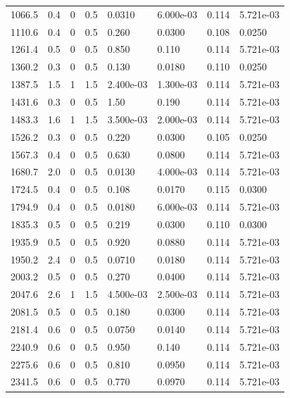 \documentclass[preview]{standalone}
\begin{document}
{{\begin{tabular}{L{1.2cm}C{1.2cm} C{0.3cm}C{0.5cm} C{1.4cm}C{1.4cm} C{1.4cm}C{1.4cm}}
  1066.5  &   0.4  & 0     & 0.5 &  0.0310  & 6.000e-03  & 0.114 &  5.721e-03   \\ 
  1110.6  &   0.4  & 0     & 0.5 &  0.260  & 0.0300  & 0.108 &  0.0250   \\ 
  1261.4  &   0.5  & 0     & 0.5 &  0.850  & 0.110  & 0.114 &  5.721e-03   \\ 
  1360.2  &   0.3  & 0     & 0.5 &  0.130  & 0.0180  & 0.110 &  0.0250   \\ 
  1387.5  &   1.5  & 1     & 1.5 &  2.400e-03  & 1.300e-03  & 0.114 &  5.721e-03   \\ 
  1431.6  &   0.3  & 0     & 0.5 &  1.50  & 0.190  & 0.114 &  5.721e-03   \\ 
  1483.3  &   1.6  & 1     & 1.5 &  3.500e-03  & 2.000e-03  & 0.114 &  5.721e-03   \\ 
  1526.2  &   0.3  & 0     & 0.5 &  0.220  & 0.0300  & 0.105 &  0.0250   \\ 
  1567.3  &   0.4  & 0     & 0.5 &  0.630  & 0.0800  & 0.114 &  5.721e-03   \\ 
  1680.7  &   2.0  & 0     & 0.5 &  0.0130  & 4.000e-03  & 0.114 &  5.721e-03   \\ 
  1724.5  &   0.4  & 0     & 0.5 &  0.108  & 0.0170  & 0.115 &  0.0300   \\ 
  1794.9  &   0.4  & 0     & 0.5 &  0.0180  & 6.000e-03  & 0.114 &  5.721e-03   \\ 
  1835.3  &   0.5  & 0     & 0.5 &  0.219  & 0.0300  & 0.110 &  0.0300   \\ 
  1935.9  &   0.5  & 0     & 0.5 &  0.920  & 0.0880  & 0.114 &  5.721e-03   \\ 
  1950.2  &   2.4  & 0     & 0.5 &  0.0710  & 0.0180  & 0.114 &  5.721e-03   \\ 
  2003.2  &   0.5  & 0     & 0.5 &  0.270  & 0.0400  & 0.114 &  5.721e-03   \\ 
  2047.6  &   2.6  & 1     & 1.5 &  4.500e-03  & 2.500e-03  & 0.114 &  5.721e-03   \\ 
  2081.5  &   0.5  & 0     & 0.5 &  0.180  & 0.0300  & 0.114 &  5.721e-03   \\ 
  2181.4  &   0.6  & 0     & 0.5 &  0.0750  & 0.0140  & 0.114 &  5.721e-03   \\ 
  2240.9  &   0.6  & 0     & 0.5 &  0.950  & 0.140  & 0.114 &  5.721e-03   \\ 
  2275.6  &   0.6  & 0     & 0.5 &  0.810  & 0.0950  & 0.114 &  5.721e-03   \\ 
  2341.5  &   0.6  & 0     & 0.5 &  0.770  & 0.0970  & 0.114 &  5.721e-03   \\ 

\end{tabular}}}
\end{document}
